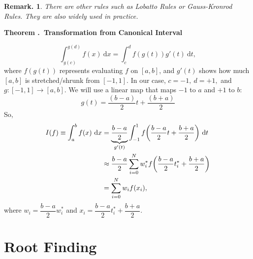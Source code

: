 \documentclass[12pt, a4paper]{article}
\newcounter{index}[subsection]
\newenvironment*{thm}[1]{\begin{tcolorbox}\par\noindent\textbf{Theorem \thesubsection.\stepcounter{index}\theindex\ #1} \par}{\par\end{tcolorbox}}
\newtheorem{rmk}{Remark.}[section]
\def\d{{\mathrm{d}}}
\begin{document}
\begin{rmk}
	There are other rules such as Lobatto Rules or Gauss-Kronrod Rules. They are also widely used in practice.	
\end{rmk}
\begin{thm}{Transformation from Canonical Interval}
	\[\int_{g(c)}^{g(d)}f(x)\ \d{x}=\int_c^df(g(t))g'(t)\ \d{t},\]	where $f(g(t))$ represents evaluating $f$ on $[a,b]$, and $g'(t)$ shows how much $[a,b]$ is stretched/shrunk from $[-1,1]$. In our case, $c=-1,\ d=+1,$ and $g:[-1,1]\to[a,b]$. We will use a linear map that maps $-1$ to $a$ and $+1$ to $b$: \[g(t)=\dfrac{(b-a)}{2}t+\dfrac{(b+a)}{2}\] So, \begin{align*}I(f)\equiv\int_a^bf(x)\ \d{x}&=\underbrace{\dfrac{b-a}{2}}_{g'(t)}\int_{-1}^1f\qty(\dfrac{b-a}{2}t+\dfrac{b+a}{2})\ \d{t}\\&\approx\dfrac{b-a}{2}\sum_{i=0}^Nw_i^*f\qty(\dfrac{b-a}{2}t_i^*+\dfrac{b+a}{2})\\&=\sum_{i=0}^Nw_if(x_i),\end{align*} where $w_i=\dfrac{b-a}{2}w_i^*$ and $x_i=\dfrac{b-a}{2}t_i^*+\dfrac{b+a}{2}$.

\end{thm}

\newpage
\section{Root Finding}
\end{document}
